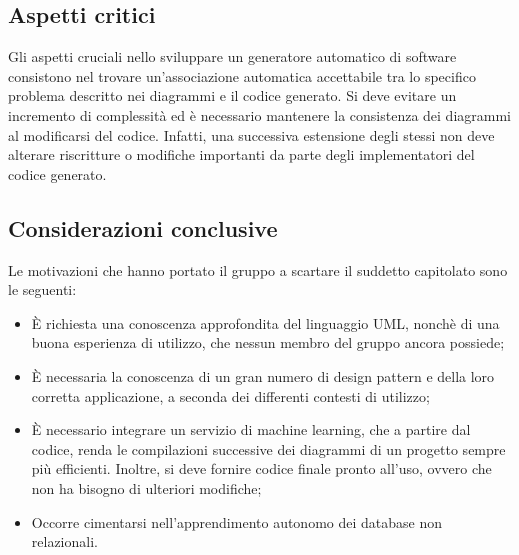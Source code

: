\subsection{Aspetti critici}

Gli aspetti cruciali nello sviluppare un generatore automatico di software consistono nel trovare un'associazione automatica accettabile tra lo specifico problema descritto nei diagrammi e il codice generato. Si deve evitare un incremento di complessità ed è necessario mantenere la consistenza dei diagrammi al modificarsi del codice. Infatti, una successiva estensione degli stessi non deve alterare riscritture o modifiche importanti da parte degli implementatori del codice generato.

\subsection{Considerazioni conclusive}

Le motivazioni che hanno portato il gruppo a scartare il suddetto capitolato sono le seguenti:
\begin{itemize}
	\item {\MakeUppercase{è}} richiesta una conoscenza approfondita del linguaggio UML, nonchè di una buona esperienza di utilizzo, che nessun membro del gruppo ancora possiede;
	\item {\MakeUppercase{è}} necessaria la conoscenza di un gran numero di design pattern e della loro corretta applicazione, a seconda dei differenti contesti di utilizzo;
	\item {\MakeUppercase{è}} necessario integrare un servizio
	di machine learning, che a partire dal codice, renda le compilazioni successive dei diagrammi di un progetto sempre più efficienti. Inoltre, si deve fornire codice finale pronto all'uso, ovvero che non ha bisogno di ulteriori modifiche;
	\item Occorre cimentarsi nell'apprendimento autonomo dei database non relazionali.
\end{itemize}